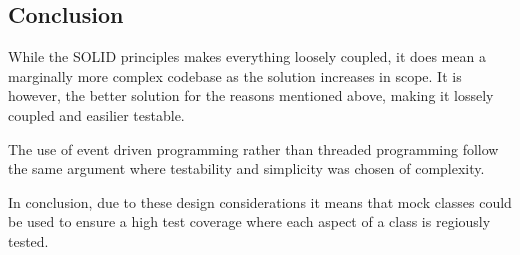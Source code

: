 \subsection{Conclusion}

While the SOLID principles makes everything loosely coupled, it does mean a marginally more
complex codebase as the solution increases in scope. It is however, the better solution
for the reasons mentioned above, making it lossely coupled and easilier testable.

The use of event driven programming rather than threaded programming follow the same 
argument where testability and simplicity was chosen of complexity.

In conclusion, due to these design considerations it means that mock classes could be 
used to ensure a high test coverage where each aspect of a class is regiously tested.

\newpage
